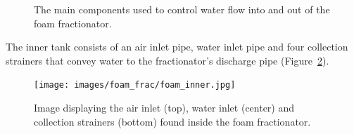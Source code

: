 \documentclass[
  12pt,
]{report}
\begin{document}
\begin{figure}[H]

\begin{minipage}[t]{0.33\linewidth}

{\centering 


}

\end{minipage}%
%
\begin{minipage}[t]{0.33\linewidth}

{\centering 


}

\end{minipage}%
%
\begin{minipage}[t]{0.33\linewidth}

{\centering 


}

\end{minipage}%

\caption{\label{fig-foamcomp}The main components used to control water
flow into and out of the foam fractionator.}

\end{figure}

The inner tank consists of an air inlet pipe, water inlet pipe and four
collection strainers that convey water to the fractionator's discharge
pipe (Figure~\ref{fig-foaminner}).

\begin{figure}[H]

{\centering \texttt{[image: images/foam\_frac/foam\_inner.jpg]}

}

\caption{\label{fig-foaminner}Image displaying the air inlet (top),
water inlet (center) and collection strainers (bottom) found inside the
foam fractionator.}

\end{figure}
\end{document}
